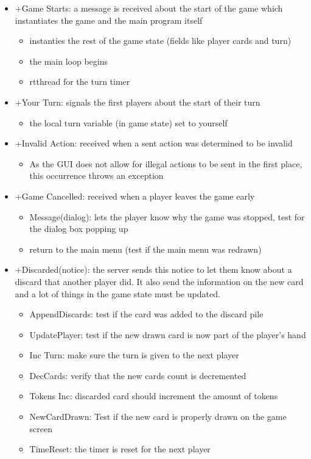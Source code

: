 \begin{description}
\begin{itemize}
		\item +Game Starts: a message is received about the start of the game which instantiates the game and the main program itself
		\begin{itemize}
		    \item instanties the rest of the game state (fields like player cards and turn)
		    \item the main loop begins 
		    \item rtthread for the turn timer
		\end{itemize}
		\item +Your Turn: signals the first players about the start of their turn
		\begin{itemize}
		    \item the local turn variable (in game state) set to yourself
		\end{itemize}
		\item +Invalid Action: received when a sent action was determined to be invalid
		\begin{itemize}
		    \item As the GUI does not allow for illegal actions to be sent in the first place, this occurrence throws an exception
		\end{itemize}
		\item +Game Cancelled: received when a player leaves the game early
		\begin{itemize}
		    \item Message(dialog): lets the player know why the game was stopped, test for the dialog box popping up
		    \item return to the main menu (test if the main menu was redrawn)
		\end{itemize}
		\item +Discarded(notice): the server sends this notice to let them know about a discard that another player did. It also send the information on the new card and a lot of things in the game state must be updated.
		\begin{itemize}
		    \item AppendDiscards: test if the card was added to the discard pile
		    \item UpdatePlayer: test if the new drawn card is now part of the player's hand
		    \item Inc Turn: make sure the turn is given to the next player
		    \item DecCards: verify that the new cards count is decremented
		    \item Tokens Inc: discarded card should increment the amount of tokens
		    \item NewCardDrawn: Test if the new card is properly drawn on the game screen
		    \item TimeReset: the timer is reset for the next player
		    

\end{itemize}
\end{itemize}
\end{description}
